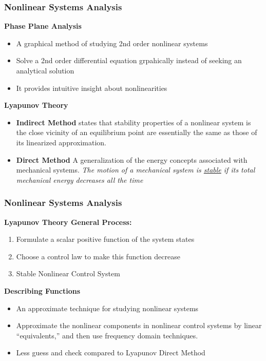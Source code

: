 \documentclass[11pt,handout]{beamer}   %
\begin{document}
\begin{frame}
\frametitle{Nonlinear Systems Analysis}
\textbf{Phase Plane Analysis}\\
\begin{itemize}
\item A graphical method of studying 2nd order nonlinear systems
\item Solve a 2nd order differential equation grpahically instead of seeking an analytical solution
\item It provides intuitive insight about nonlinearities
\end{itemize}
\textbf{Lyapunov Theory}\\
\begin{itemize}
\item \textbf{Indirect Method} states that stability properties of a nonlinear system is the close vicinity of an equilibrium point are essentially the same as those of its linearized approximation.
\item \textbf{Direct Method} A generalization of the energy concepts associated with mechanical systems. \textit{The motion of a mechanical system is \underline{stable} if its total mechanical energy decreases all the time}
\end{itemize}
\end{frame}

\begin{frame}
\frametitle{Nonlinear Systems Analysis}
\textbf{Lyapunov Theory General Process:}
\begin{enumerate}
\item Formulate a scalar positive function of the system states
\item Choose a control law to make this function decrease
\item Stable Nonlinear Control System
\end{enumerate}
\textbf{Describing Functions}
\begin{itemize}
\item An approximate technique for studying nonlinear systems
\item Approximate the nonlinear components in nonlinear control systems by linear ``equivalents,'' and then use frequency domain techniques.
\item Less guess and check compared to Lyapunov Direct Method
\end{itemize}
\end{frame}
\end{document}

